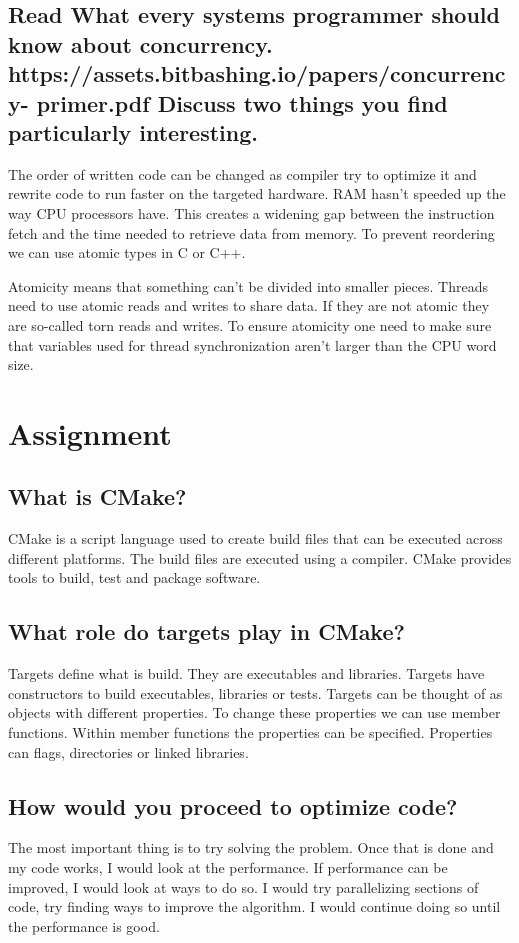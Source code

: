 \documentclass[runningheads]{llncs}
\begin{document}
\subsection{Read What every systems programmer should know about concurrency. https://assets.bitbashing.io/papers/concurrency- primer.pdf
Discuss two things you find particularly interesting.}
The order of written code can be changed as compiler try to optimize it and rewrite code to run faster on the targeted hardware.
RAM hasn’t speeded up the way CPU processors have. This creates a widening gap between the instruction fetch and the time 
needed to retrieve data from memory.
To prevent reordering we can use atomic types in C or C++.

Atomicity means that something can’t be divided into smaller pieces. Threads need to use atomic reads and writes to share data. 
If they are not atomic they are so-called torn reads and writes.
To ensure atomicity one need to make sure that variables used for thread synchronization aren’t larger than the CPU word size.

\section{Assignment}

\subsection{What is CMake?}
CMake is a script language used to create build files that can be executed across different platforms.
The build files are executed using a compiler. CMake provides tools to build, test and package software.

\subsection{What role do targets play in CMake?}
Targets define what is build. They are executables and libraries.
Targets have constructors to build executables, libraries or tests.
Targets can be thought of as objects with different properties. To change these properties we can use member functions.
Within member functions the properties can be specified. Properties can flags, directories or linked libraries.

\subsection{How would you proceed to optimize code?}
The most important thing is to try solving the problem. Once that is done and my code works, I would look at the performance.
If performance can be improved, I would look at ways to do so. I would try parallelizing sections of code, try finding ways to improve the algorithm.
I would continue doing so until the performance is good.
\end{document}
